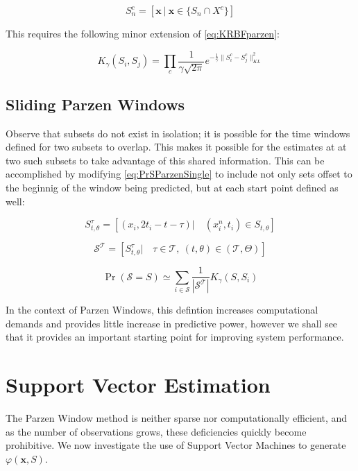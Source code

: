 \documentclass[10pt]{article}
\begin{document}
\[ S_n^c = [ \mathbf{x} \ | \ \mathbf{x} \in \{ S_n \cap X^c \} ] \]

This requires the following minor extension of \ref{eq:KRBFparzen}:

\begin{equation} \label{eq:KRBFParzenMultiple}
K_\gamma( S_i, S_j ) =  \prod_c \frac{1}{\gamma \sqrt{2\pi} } e^{-\frac{1}{\gamma} \|S_i^c - S_j^c \|_{KL}^2 }
\end{equation}


\subsection{Sliding Parzen Windows}

Observe that subsets do not exist in isolation; it is possible for the time windows defined for two subsets to overlap.  This makes it possible for the estimates at at two such subsets to take advantage of this shared information.  This can be accomplished by modifying \ref{eq:PrSParzenSingle} to include not only sets offset to the beginnig of the window being predicted, but at each start point defined as well:

\[
S_{t,\theta}^\tau =  \left[ \left( x_i, 2t_i - t - \tau \right) | \quad (x_i^n,t_i) \in S_{t,\theta} \right] 
\]

\[
\mathcal{S}^{\mathcal{T}} = [ S_{t,\theta}^\tau | \quad \tau \in \mathcal{T}, \ (t,\theta) \in (\mathcal{T},\Theta) ]
\]

\begin{equation} \label{eq:PrSParzenSlidingSingle}
\Pr( \mathcal{S} = S ) \simeq \sum_{i \in \mathcal{S}}  \frac{1}{|\mathcal{S}^{\mathcal{T}}| } K_\gamma( S, S_i ) 
\end{equation}

In the context of Parzen Windows, this defintion increases computational demands and provides little increase in predictive power, however we shall see that it provides an important starting point for improving system performance.


\section{ Support Vector Estimation}

The Parzen Window method is neither sparse nor computationally efficient, and as the number of observations grows, these deficiencies quickly become prohibitive.  We now investigate the use of Support Vector Machines to generate \( \varphi(\mathbf{x}, S) \).
\end{document}
